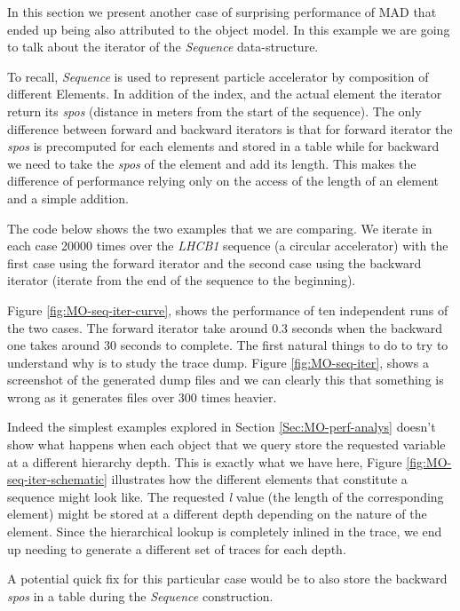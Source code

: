 In this section we present another case of surprising performance of MAD that
ended up being also attributed to the object model. In this example we are going
to talk about the iterator of the \emph{Sequence} data-structure.

To recall,
\emph{Sequence} is used to represent particle accelerator by composition of
different Elements. In addition of the index, and the actual element the iterator
return its \emph{spos} (distance in meters from the start of the sequence). The
only difference between forward and backward iterators is that for forward iterator
the \emph{spos} is precomputed for each elements and stored in a table while for
backward we need to take the \emph{spos} of the element and add its length. This
makes the difference of performance relying only on the access of the length of
an element and a simple addition.

The code below shows the two examples that we are comparing. We iterate in each
case 20000 times over the \emph{LHCB1} sequence (a circular accelerator) with
the first case using the forward iterator and the second case using the backward
iterator (iterate from the end of the sequence to the beginning).

Figure \ref{fig:MO-seq-iter-curve}, shows the performance of ten independent
runs of the two cases. The forward iterator take around 0.3 seconds when the
backward one takes around 30 seconds to complete. The first natural things to do
to try to understand why is to study the trace dump. Figure \ref{fig:MO-seq-iter},
shows a screenshot of the generated dump files and we can clearly this that
something is wrong as it generates files over 300 times heavier.

Indeed the simplest examples explored in Section \ref{Sec:MO-perf-analys} doesn't
show what happens when each object that we query store the requested variable at
a different hierarchy depth. This is exactly what we have here, Figure
\ref{fig:MO-seq-iter-schematic} illustrates how the different elements that
constitute a sequence might look like. The requested \emph{l} value (the length
of the corresponding element) might be stored at a different depth depending on
the nature of the element. Since the hierarchical lookup is completely inlined
in the trace, we end up needing to generate a different set of traces for each
depth.

A potential quick fix for this particular case would be to also store the
backward \emph{spos} in a table during the \emph{Sequence} construction.

